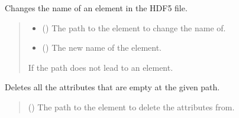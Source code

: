 \documentclass[letterpaper,10pt,english]{sphinxmanual}
\begin{document}
\begin{fulllineitems}
\begin{fulllineitems}
\begin{quote}
\begin{description}
\begin{itemize}
\end{itemize}

\end{description}\end{quote}

\end{fulllineitems}


\begin{fulllineitems}
\label{\detokenize{_autosummary/HDF5_BLS.wrapper:HDF5_BLS.wrapper.Wrapper.change_name}}
\pysigstartsignatures
\pysiglinewithargsret
{}
{\sphinxparamcomma {}}
{}
\pysigstopsignatures
\sphinxAtStartPar
Changes the name of an element in the HDF5 file.
\begin{quote}\begin{description}
\begin{itemize}
\item {} 
\sphinxAtStartPar
{} () \textendash{} The path to the element to change the name of.

\item {} 
\sphinxAtStartPar
{} () \textendash{} The new name of the element.

\end{itemize}

\sphinxAtStartPar
{} \textendash{} If the path does not lead to an element.

\end{description}\end{quote}

\end{fulllineitems}


\begin{fulllineitems}
\label{\detokenize{_autosummary/HDF5_BLS.wrapper:HDF5_BLS.wrapper.Wrapper.clear_empty_attributes}}
\pysigstartsignatures
\pysiglinewithargsret
{}
{}
{}
\pysigstopsignatures
\sphinxAtStartPar
Deletes all the attributes that are empty at the given path.
\begin{quote}\begin{description}
\sphinxAtStartPar
{} () \textendash{} The path to the element to delete the attributes from.


\end{description}
\end{quote}
\end{fulllineitems}
\end{fulllineitems}
\end{document}
